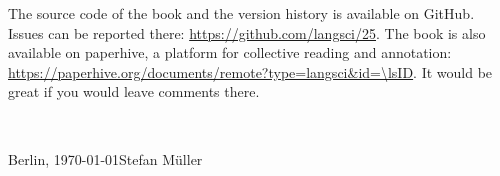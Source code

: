 The source code of the book and the version history is available on GitHub. Issues can be reported
there: \url{https://github.com/langsci/25}. The book is also available on paperhive, a platform for
collective reading and annotation:
\url{https://paperhive.org/documents/remote?type=langsci&id=\lsID}. It would be great if you would
leave comments there.  





%




~\medskip

\noindent
Berlin, \today\hfill Stefan Müller



